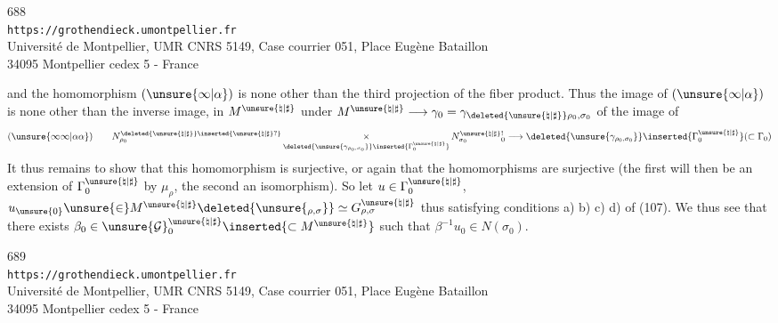 
\begin{center}
688\\
\texttt{https://grothendieck.umontpellier.fr}\\
Université de Montpellier, UMR CNRS 5149, Case courrier 051, Place Eugène Bataillon\\
34095 Montpellier cedex 5 - France
\end{center}



and the homomorphism $(\unsure{\infty|\alpha})$ is none other than the third projection of the fiber product.
Thus the image of $(\unsure{\infty|\alpha})$ is none other than the inverse image, in $M^{\unsure{\natural|\sharp}}$ under $M^{\unsure{\natural|\sharp}}\longrightarrow\gamma_0=\gamma_{\deleted{\unsure{\natural|\sharp}}\rho_0,\sigma_0}$ of the image of
\[
 (\unsure{\infty\infty|\alpha\alpha})\qquad
 N_{\rho_0}^{\deleted{\unsure{\natural|\sharp}}\inserted{\unsure{\natural|\sharp}?}}
 \mathop{\times}_{\deleted{\unsure{\gamma_{\rho_0,\sigma_0}}}\inserted{\Gamma_0^{\unsure{\natural|\sharp}}}}
 N_{\sigma_0}^{\unsure{\natural|\sharp}}{}_{0}^{!}
 \longrightarrow
 \deleted{\unsure{\gamma_{\rho_0,\sigma_0}}}\inserted{\Gamma_0^{\unsure{\natural|\sharp}}}
 (\subset\Gamma_0)
\]
It thus remains to show that this homomorphism is surjective, or again that the homomorphisms
are surjective (the first will then be an extension of $\Gamma_0^{\unsure{\natural|\sharp}}$ by $\mu_\rho$, the second an isomorphism). So let $u\in\Gamma_0^{\unsure{\natural|\sharp}}$,  $u_{\unsure{0}}\unsure{\in}M^{\unsure{\natural|\sharp}}\deleted{\unsure{_{\rho,\sigma}}}\simeq G_{\rho,\sigma}^{\unsure{\natural|\sharp}}$ thus satisfying conditions a) b) c) d) of (107). We thus see that there exists $\beta_0\in\unsure{\mathcal G}_0^{\unsure{\natural|\sharp}}\inserted{\subset M^{\unsure{\natural|\sharp}}}$ such that $\beta^{-1}u_0\in N(\sigma_0)$.



\begin{center}
689\\
\texttt{https://grothendieck.umontpellier.fr}\\
Université de Montpellier, UMR CNRS 5149, Case courrier 051, Place Eugène Bataillon\\
34095 Montpellier cedex 5 - France
\end{center}